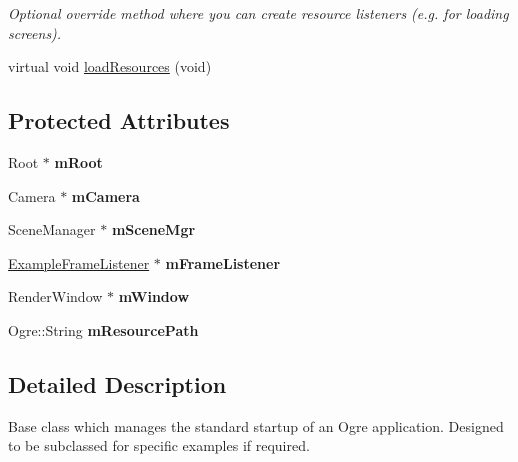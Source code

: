 \begin{DoxyCompactItemize}
\begin{DoxyCompactList}\small\item\em Optional override method where you can create resource listeners (e.g. for loading screens). \item\end{DoxyCompactList}\item 
virtual void \hyperlink{class_example_application_a3c5a3d3f81680b6ea0654dc561be2498}{loadResources} (void)
\end{DoxyCompactItemize}
\subsection*{Protected Attributes}
\begin{DoxyCompactItemize}
\item 
\hypertarget{class_example_application_a0701a08b03ecdc5da37f74d1f55797f4}{
Root $\ast$ {\bfseries mRoot}}
\label{class_example_application_a0701a08b03ecdc5da37f74d1f55797f4}

\item 
\hypertarget{class_example_application_a6341ffca7ae43cc6fb832b6ccdb9e59c}{
Camera $\ast$ {\bfseries mCamera}}
\label{class_example_application_a6341ffca7ae43cc6fb832b6ccdb9e59c}

\item 
\hypertarget{class_example_application_abcc2ea5b956dd7feeb2e57ec214ca730}{
SceneManager $\ast$ {\bfseries mSceneMgr}}
\label{class_example_application_abcc2ea5b956dd7feeb2e57ec214ca730}

\item 
\hypertarget{class_example_application_a1b926342408a09b8083a5fda1440df24}{
\hyperlink{class_example_frame_listener}{ExampleFrameListener} $\ast$ {\bfseries mFrameListener}}
\label{class_example_application_a1b926342408a09b8083a5fda1440df24}

\item 
\hypertarget{class_example_application_a8a228665f0a23d272635443747595e97}{
RenderWindow $\ast$ {\bfseries mWindow}}
\label{class_example_application_a8a228665f0a23d272635443747595e97}

\item 
\hypertarget{class_example_application_aec2ff6dbae5d0359dc9b5170bfcec99a}{
Ogre::String {\bfseries mResourcePath}}
\label{class_example_application_aec2ff6dbae5d0359dc9b5170bfcec99a}

\end{DoxyCompactItemize}


\subsection{Detailed Description}
Base class which manages the standard startup of an Ogre application. Designed to be subclassed for specific examples if required. 


